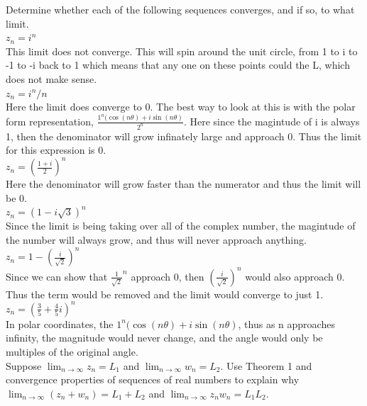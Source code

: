 \documentclass[12pt]{article}
\begin{document}
 Determine whether each of the following sequences converges, and if so, to what limit.\\

 $z_n = i^n$ \\

This limit does not converge.
This will spin around the unit circle, from 1 to i to -1 to -i back to 1 which means that any one on these points could the L, which does not make sense.\\

 $z_n = i^n/n$ \\

Here the limit does converge to 0.
The best way to look at this is with the polar form representation, $ \frac{1^n(\cos(n\theta) + i\sin(n\theta)}{2^n}$.
Here since the magintude of i is always 1, then the denominator will grow infinately large and approach 0.
Thus the limit for this expression is 0.\\

 $z_n = (\frac{1+i}{2})^n$ \\

Here the denominator will grow faster than the numerator and thus the limit will be 0.\\

 $z_n = (1 - i\sqrt{3})^n$\\

Since the limit is being taking over all of the complex number, the magintude of the number will always grow, and thus will never approach anything.\\

 $z_n = 1 - (\frac{i}{\sqrt{2}})^n$\\

Since we can show that $\frac{1}{\sqrt{2}}^n$ approach 0, then $(\frac{i}{\sqrt{2}})^n$ would also approach 0.
Thus the term would be removed and the limit would converge to just 1.\\

 $z_n = (\frac{3}{5} + \frac{4}{5}i)^n$\\

In polar coordinates, the $1^n(\cos(n\theta) + i\sin(n\theta)$, thus as n approaches infinity, the magnitude would never change, and the angle would only be multiples of the original angle.\\


 Suppose $ \lim_{n\to\infty} z_n = L_1$ and $\lim_{n\to\infty} w_n = L_2$.  
Use Theorem 1 and convergence properties of sequences of real numbers to explain why 
$\lim_{n\to\infty} (z_n + w_n) = L_1 + L_2$ and $\lim_{n\to\infty} z_nw_n = L_1L_2$.\\
\end{document}
